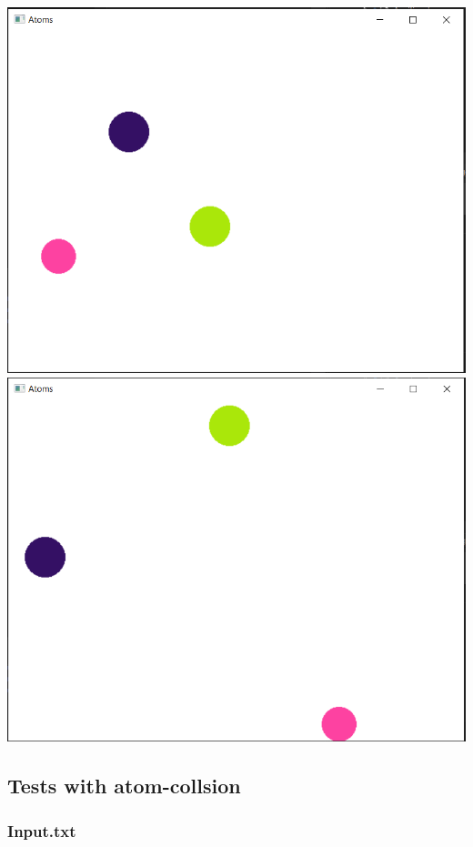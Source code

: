 \documentclass[11pt,titlepage]{article}
\begin{document}
			\includegraphics[scale=0.5]{pictures/random_nocollision.png}
			\includegraphics[scale=0.5]{pictures/random_nocollision_final.png}
\newpage
		\subsection{Tests with atom-collsion}
			\subsubsection{Input.txt}
			
\end{document}
